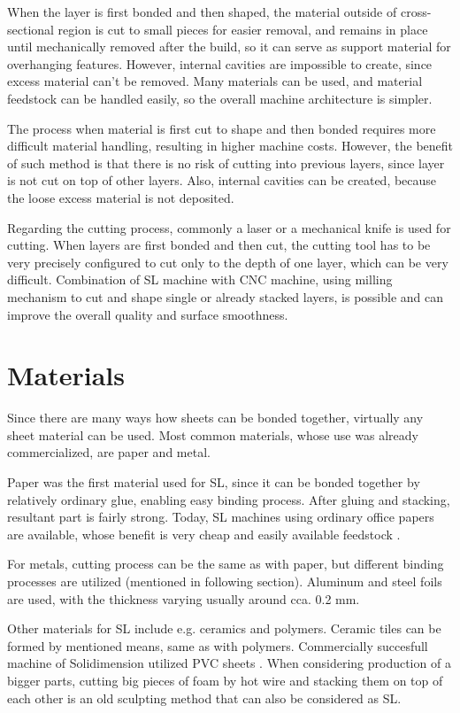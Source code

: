 \documentclass[a4paper, twoside, 11pt]{report}
\begin{document}
	When the layer is first bonded and then shaped, the material outside of cross-sectional region is cut to small pieces for easier removal, and remains in place until mechanically removed after the build, so it can serve as support material for overhanging features. However, internal cavities are impossible to create, since excess material can't be removed. Many materials can be used, and material feedstock can be handled easily, so the overall machine architecture is simpler.
	
	The process when material is first cut to shape and then bonded requires more difficult material handling, resulting in higher machine costs. However, the benefit of such method is that there is no risk of cutting into previous layers, since layer is not cut on top of other layers. Also, internal cavities can be created, because the loose excess material is not deposited.
	
	Regarding the cutting process, commonly a laser or a mechanical knife is used for cutting. When layers are first bonded and then cut, the cutting tool has to be very precisely configured to cut only to the depth of one layer, which can be very difficult. Combination of SL machine with CNC machine, using milling mechanism to cut and shape single or already stacked layers, is possible and can improve the overall quality and surface smoothness.

\section{Materials}
Since there are many ways how sheets can be bonded together, virtually any sheet material can be used. Most common materials, whose use was already commercialized, are paper and metal.

	Paper was the first material used for SL, since it can be bonded together by relatively ordinary glue, enabling easy binding process. After gluing and stacking, resultant part is fairly strong. Today, SL machines using ordinary office papers are available, whose benefit is very cheap and easily available feedstock \cite{mcor}.

	For metals, cutting process can be the same as with paper, but different binding processes are utilized (mentioned in following section). Aluminum and steel foils are used, with the thickness varying usually around cca. 0.2 mm.
	
	Other materials for SL include e.g. ceramics and polymers. Ceramic tiles can be formed by mentioned means, same as with polymers. Commercially succesfull machine of Solidimension utilized PVC sheets \cite{cubic}. When considering production of a bigger parts, cutting big pieces of foam by hot wire and stacking them on top of each other is an old sculpting method that can also be considered as SL.
\end{document}
